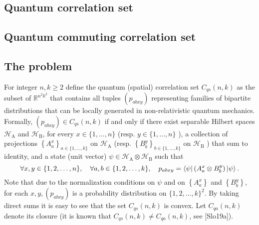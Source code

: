 \subsection{Quantum correlation set}
\subsection{Quantum commuting correlation set}
\subsection{The problem}
For integer $n, k \geq 2$ define the quantum (spatial) correlation set $C_{q s}(n, k)$ as the subset of $\mathbb{R}^{n^{2} k^{2}}$ that contains all tuples $\left(p_{a b x y}\right)$ representing families of bipartite distributions that can be locally generated in non-relativistic quantum mechanics. Formally, $\left(p_{a b x y}\right) \in C_{q s}(n, k)$ if and only if there exist separable Hilbert spaces $\mathcal{H}_{\mathrm{A}}$ and $\mathcal{H}_{\mathrm{B}}$, for every $x \in\{1, \ldots, n\}$ (resp. $y \in\{1, \ldots, n\}$ ), a collection of projections $\left\{A_{a}^{x}\right\}_{a \in\{1, \ldots, k\}}$ on $\mathcal{H}_{\mathrm{A}}$ (resp. $\left\{B_{b}^{y}\right\}_{b \in\{1, \ldots, k\}}$ on $\mathcal{H}_{\mathrm{B}}$ ) that sum to identity, and a state (unit vector) $\psi \in \mathcal{H}_{\mathrm{A}} \otimes \mathcal{H}_{\mathrm{B}}$ such that
\begin{equation}
\forall x, y \in\{1,2, \ldots, n\}, \quad \forall a, b \in\{1,2, \ldots, k\}, \quad p_{a b x y}=\bra{\psi}\left(A_{a}^{x} \otimes B_{b}^{y}\right) \ket{\psi} .
\end{equation}
Note that due to the normalization conditions on $\psi$ and on $\left\{A_{a}^{x}\right\}$ and $\left\{B_{b}^{y}\right\}$, for each $x, y,\left(p_{a b x y}\right)$ is a probability distribution on $\{1,2, \ldots, k\}^{2}$. By taking direct sums it is easy to see that the set $C_{q s}(n, k)$ is convex. Let $C_{q a}(n, k)$ denote its closure (it is known that $C_{q s}(n, k) \neq C_{q a}(n, k)$, see [Slo19a]).